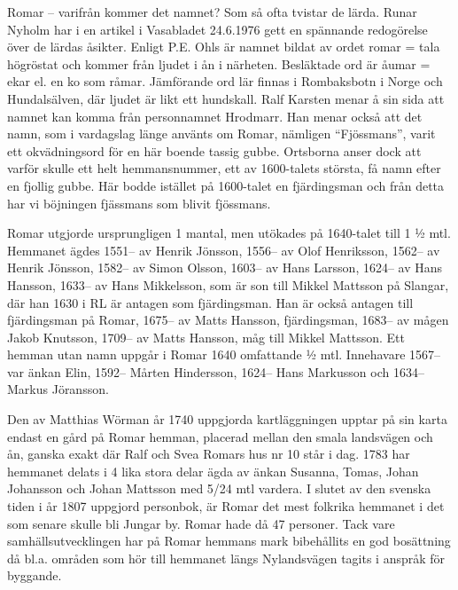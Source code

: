 
Romar – varifrån kommer det namnet? Som så ofta tvistar de lärda. Runar Nyholm har i en artikel i Vasabladet 24.6.1976 gett en spännande redogörelse över de lärdas åsikter. Enligt P.E. Ohls är namnet bildat av ordet romar  = tala högröstat och kommer från ljudet i ån i närheten. Besläktade ord är åumar  = ekar el. en ko som råmar. Jämförande ord lär finnas i Rombaksbotn i Norge och Hundalsälven, där ljudet är likt ett hundskall. Ralf Karsten menar å sin sida att namnet kan komma från personnamnet Hrodmarr. Han menar också att det namn, som i vardagslag länge använts om Romar, nämligen ``Fjössmans'', varit ett okvädningsord för en här boende tassig gubbe. Ortsborna anser dock att varför skulle ett helt hemmansnummer, ett av 1600-talets största, få namn efter en fjollig gubbe. Här bodde istället på 1600-talet en fjärdingsman och från detta har vi böjningen fjässmans som blivit fjössmans.

Romar utgjorde ursprungligen 1 mantal, men utökades på 1640-talet till 1 ½ mtl. Hemmanet ägdes 1551-- av Henrik Jönsson, 1556-- av Olof Henriksson, 1562-- av Henrik Jönsson, 1582-- av Simon Olsson, 1603-- av Hans Larsson, 1624-- av Hans Hansson, 1633-- av Hans Mikkelsson, som är son till Mikkel Mattsson på Slangar, där han 1630 i RL är antagen som fjärdingsman. Han är också antagen till fjärdingsman på Romar, 1675-- av Matts Hansson, fjärdingsman, 1683-- av mågen Jakob Knutsson, 1709-- av Matts Hansson, måg till Mikkel Mattsson. Ett hemman utan namn uppgår i Romar 1640 omfattande ½ mtl. Innehavare 1567-- var änkan Elin, 1592-- Mårten Hindersson, 1624-- Hans Markusson och 1634-- Markus Jöransson.

Den av Matthias Wörman år 1740 uppgjorda kartläggningen upptar på sin karta endast en gård på Romar hemman, placerad mellan den smala landsvägen och ån, ganska exakt där Ralf och Svea Romars hus nr 10 står i dag. 1783 har hemmanet delats i 4 lika stora delar ägda av änkan Susanna, Tomas, Johan Johansson och Johan Mattsson med 5/24 mtl vardera. I slutet av den svenska tiden i år 1807 uppgjord personbok, är Romar det mest folkrika hemmanet i det som senare skulle bli Jungar by. Romar hade då 47 personer. Tack vare samhällsutvecklingen har på Romar hemmans mark bibehållits en god bosättning då bl.a. områden som hör till hemmanet längs Nylandsvägen tagits i anspråk för byggande.

